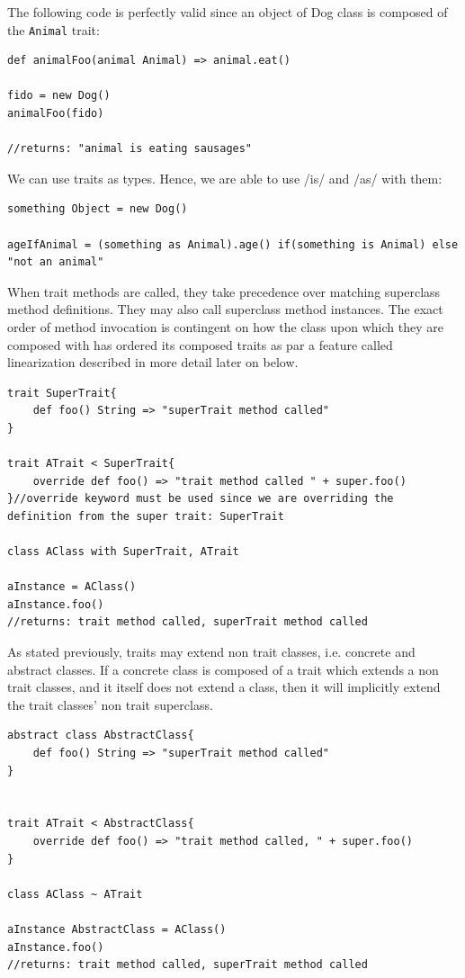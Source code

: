 \documentclass[conc-doc]{subfiles}
\begin{document}
The following code is perfectly valid since an object of Dog class is composed of the \lstinline{Animal} trait:
\begin{lstlisting}
def animalFoo(animal Animal) => animal.eat()

fido = new Dog()
animalFoo(fido)

//returns: "animal is eating sausages"
\end{lstlisting}

We can use traits as types. Hence, we are able to use /is/ and /as/ with them:
\begin{lstlisting}
something Object = new Dog()

ageIfAnimal = (something as Animal).age() if(something is Animal) else "not an animal"
\end{lstlisting}

When trait methods are called, they take precedence over matching superclass method definitions. They may also call superclass method instances. The exact order of method invocation is contingent on how the class upon which they are composed with has ordered its composed traits as par a feature called linearization described in more detail later on below.

\begin{lstlisting}
trait SuperTrait{
	def foo() String => "superTrait method called"
}

trait ATrait < SuperTrait{
	override def foo() => "trait method called " + super.foo()
}//override keyword must be used since we are overriding the definition from the super trait: SuperTrait

class AClass with SuperTrait, ATrait

aInstance = AClass() 
aInstance.foo()
//returns: trait method called, superTrait method called
\end{lstlisting}

As stated previously, traits may extend non trait classes, i.e. concrete and abstract classes. If a concrete class is composed of a trait which extends a non trait classes, and it itself does not extend a class, then it will implicitly extend the trait classes' non trait superclass.

\begin{lstlisting}
abstract class AbstractClass{
	def foo() String => "superTrait method called"
}


trait ATrait < AbstractClass{
	override def foo() => "trait method called, " + super.foo()
}

class AClass ~ ATrait 

aInstance AbstractClass = AClass() 
aInstance.foo()
//returns: trait method called, superTrait method called
\end{lstlisting}
\end{document}
